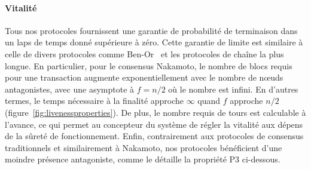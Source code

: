 \documentclass[letterpaper,twocolumn,10pt]{article}
\newcommand{\tronly}[2]{#1}
\theoremstyle{definition}
\begin{document}
\paragraph{Vitalité} Tous nos protocoles fournissent une garantie de probabilité de terminaison dans un laps de temps donné supérieure à zéro.
Cette garantie de limite est similaire à celle de divers protocoles comme Ben-Or~\cite{ben1983another} et les protocoles de chaîne la plus longue.
En particulier, pour le consensus Nakamoto, le nombre de blocs requis pour une transaction augmente exponentiellement avec le nombre de nœuds antagonistes, avec une asymptote à $f = n/2$ où le nombre est infini. %
En d'autres termes, le temps nécessaire à la finalité approche $\infty$ quand $f$ approche $n/2$\tronly{ (figure~\ref{fig:livenessproperties}).}{.}
De plus, le nombre requis de tours est calculable à l'avance, ce qui permet au concepteur du système de régler la vitalité aux dépens de la sûreté de fonctionnement. Enfin, contrairement aux protocoles de consensus traditionnels et similairement à Nakamoto, nos protocoles bénéficient d'une moindre présence antagoniste, comme le détaille la propriété P3 ci-dessous.
\end{document}

